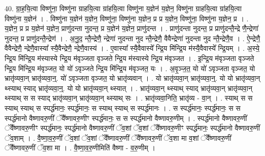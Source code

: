 \documentclass[17pt]{extarticle}
\begin{document}
40. ग्रा॒ह॒यि॒त्वा विष्णु॑ना॒ विष्णु॑ना ग्राहयि॒त्वा ग्रा॑हयि॒त्वा विष्णु॑ना य॒ज्ञेन॑ य॒ज्ञेन॒ विष्णु॑ना ग्राहयि॒त्वा ग्रा॑हयि॒त्वा विष्णु॑ना य॒ज्ञेन॑ । . विष्णु॑ना य॒ज्ञेन॑ य॒ज्ञेन॒ विष्णु॑ना॒ विष्णु॑ना य॒ज्ञेन॒ प्र प्र य॒ज्ञेन॒ विष्णु॑ना॒ विष्णु॑ना य॒ज्ञेन॒ प्र । . य॒ज्ञेन॒ प्र प्र य॒ज्ञेन॑ य॒ज्ञेन॒ प्राणु॑दन्ता नुदन्त॒ प्र य॒ज्ञेन॑ य॒ज्ञेन॒ प्राणु॑दन्त । . प्राणु॑दन्ता नुदन्त॒ प्र प्राणु॑दन्तै॒न्द्रे णै॒न्द्रेणा॑ नुदन्त॒ प्र प्राणु॑दन्तै॒न्द्रेण॑ । . अ॒नु॒द॒ न्तै॒न्द्रेणै॒ न्द्रेणा॑ नुदन्ता नुद न्तै॒न्द्रेणै॒ वैवैन्द्रेणा॑ नुदन्ता नुद न्तै॒न्द्रेणै॒व । . ऐ॒न्द्रेणै॒ वैवैन्द्रेणै॒ न्द्रेणै॒वास्या᳚ स्यै॒वैन्द्रेणै॒ न्द्रेणै॒वास्य॑ । . ए॒वास्या᳚ स्यै॒वैवास्ये᳚ न्द्रि॒य मि॑न्द्रि॒य म॑स्यै॒वैवास्ये᳚ न्द्रि॒यम् । . अ॒स्ये॒ न्द्रि॒य मि॑न्द्रि॒य म॑स्यास्ये न्द्रि॒य म॑वृञ्जता वृञ्जते न्द्रि॒य म॑स्यास्ये न्द्रि॒य म॑वृञ्जत । . इ॒न्द्रि॒य म॑वृञ्जता वृञ्जते न्द्रि॒य मि॑न्द्रि॒य म॑वृञ्जत॒ यो यो॑ ऽवृञ्जते न्द्रि॒य मि॑न्द्रि॒य म॑वृञ्जत॒ यः । . अ॒वृ॒ञ्ज॒त॒ यो यो॑ ऽवृञ्जता वृञ्जत॒ यो भ्रातृ॑व्यवा॒न् भ्रातृ॑व्यवा॒न्॒. यो॑ ऽवृञ्जता वृञ्जत॒ यो भ्रातृ॑व्यवान् । . यो भ्रातृ॑व्यवा॒न् भ्रातृ॑व्यवा॒न्॒. यो यो भ्रातृ॑व्यवा॒न् थ्स्याथ् स्याद् भ्रातृ॑व्यवा॒न्॒. यो यो भ्रातृ॑व्यवा॒न् थ्स्यात् । . भ्रातृ॑व्यवा॒न् थ्स्याथ् स्याद् भ्रातृ॑व्यवा॒न् भ्रातृ॑व्यवा॒न् थ्स्याथ् स स स्याद् भ्रातृ॑व्यवा॒न् भ्रातृ॑व्यवा॒न् थ्स्याथ् सः । . भ्रातृ॑व्यवा॒निति॒ भ्रातृ॑व्य - वा॒न् । . स्याथ् स स स्याथ् स्याथ् स स्पर्द्ध॑मानः॒ स्पर्द्ध॑मानः॒ स स्याथ् स्याथ् स स्पर्द्ध॑मानः । . स स्पर्द्ध॑मानः॒ स्पर्द्ध॑मानः॒ स स स्पर्द्ध॑मानो वैष्णावरु॒णीं ॅवै᳚ष्णावरु॒णीꣳ स्पर्द्ध॑मानः॒ स स स्पर्द्ध॑मानो वैष्णावरु॒णीम् । . स्पर्द्ध॑मानो वैष्णावरु॒णीं ॅवै᳚ष्णावरु॒णीꣳ स्पर्द्ध॑मानः॒ स्पर्द्ध॑मानो वैष्णावरु॒णीं ॅव॒शां ॅव॒शां ॅवै᳚ष्णावरु॒णीꣳ स्पर्द्ध॑मानः॒ स्पर्द्ध॑मानो वैष्णावरु॒णीं ॅव॒शाम् । . वै॒ष्णा॒व॒रु॒णीं ॅव॒शां ॅव॒शां ॅवै᳚ष्णावरु॒णीं ॅवै᳚ष्णावरु॒णीं ॅव॒शा मा व॒शां ॅवै᳚ष्णावरु॒णीं ॅवै᳚ष्णावरु॒णीं ॅव॒शा मा । . वै॒ष्णा॒व॒रु॒णीमिति॑ वैष्णा - व॒रु॒णीम् । \newline
\pagebreak
{}
\end{document}
